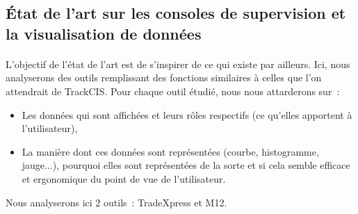 		\subsection{État de l'art sur les consoles de supervision et la visualisation de données}
			\paragraph{}
			L'objectif de l'état de l'art est de s'inspirer de ce qui existe par
			ailleurs.
			Ici, nous analyserons des outils remplissant des
			fonctions similaires à celles que l’on attendrait de TrackCIS. Pour chaque
			outil étudié, nous nous attarderons sur~:
			\begin{itemize}
			  \item Les données qui sont affichées et leurs rôles respectifs (ce qu'elles
			  apportent à l'utilisateur),
			  \item La manière dont ces données sont représentées (courbe, histogramme,
			  jauge...), pourquoi elles sont représentées de la sorte et si cela semble
			  efficace et ergonomique du point de vue de l’utilisateur.
			\end{itemize}
			Nous analyserons ici 2 outils~: TradeXpress et M12.
			
